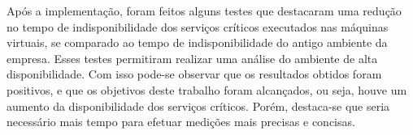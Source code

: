 Após a implementação, foram feitos alguns testes que destacaram uma redução no tempo de indisponibilidade dos serviços 
críticos executados nas máquinas virtuais, se comparado ao tempo de indisponibilidade do antigo ambiente da empresa. 
Esses testes permitiram realizar uma análise do ambiente de alta disponibilidade.
Com isso pode-se observar que os resultados obtidos foram positivos, e que os objetivos deste trabalho foram alcançados, ou seja, houve um 
aumento da disponibilidade dos serviços críticos. Porém, destaca-se que seria necessário mais tempo para efetuar medições mais precisas e concisas.

